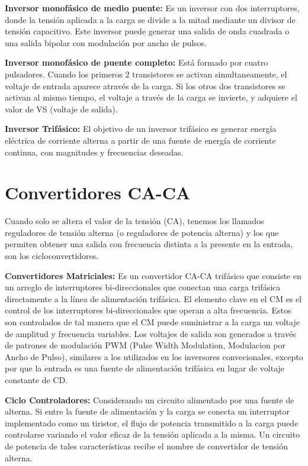 \documentclass[08pt]{article}
\begin{document}
\textbf{Inversor monofásico de medio puente:} Es un inversor con dos interruptores, donde la tensión aplicada a la carga se divide a la mitad mediante un  divisor de tensión capacitivo.
Este inversor puede generar una salida de onda cuadrada o una salida bipolar con modulación por ancho de pulsos.

\textbf{Inversor monofásico de puente completo:} Está formado por cuatro pulsadores. Cuando los primeros 2  transistores se activan simultaneamente, el voltaje de entrada aparece através de la carga. Si los otros dos transistores se activan al mismo tiempo, el voltaje a través de la carga se invierte, y adquiere el valor de VS (voltaje de salida).

\textbf{Inversor Trifásico:} El objetivo de un inversor trifásico es generar energía  eléctrica de corriente alterna a partir de  una fuente de energía de corriente continua, con magnitudes y frecuencias deseadas.


\section{Convertidores CA-CA}
Cuando solo se altera el valor de la tensión (CA), tenemos los llamados reguladores de  tensión alterna (o reguladores de potencia alterna) y los que permiten obtener una salida con frecuencia distinta a la presente en la entrada, son los cicloconvertidores.


\textbf{Convertidores Matriciales:} Es un convertidor CA-CA trifásico que consiste en un arreglo de interruptores bi-direccionales que conectan una carga trifásica directamente a la línea de alimentación trifásica.
El elemento clave en el CM es el control de los interruptores bi-direccionales que operan a alta frecuencia. Estos son controlados de tal manera que el CM puede suministrar a la carga un voltaje de amplitud y frecuencia variables.
Los voltajes de salida son generados a través de patrones de modulación PWM (Pulse Width Modulation, Modulacion por Ancho de Pulso), similares a los utilizados en los inversores convecionales, excepto por que la entrada es una fuente de alimentación trifásica en lugar de voltaje constante de CD.

\textbf{Ciclo Controladores:} Considerando un circuito alimentado por una fuente de alterna. Si entre la fuente de alimentación y la carga se conecta un interruptor implementado como un tiristor, el flujo de potencia transmitido a la carga puede controlarse variando el valor eficaz de la tensión aplicada a la misma. Un circuito de potencia de tales características recibe el nombre de convertidor de tensión alterna.
\end{document}
